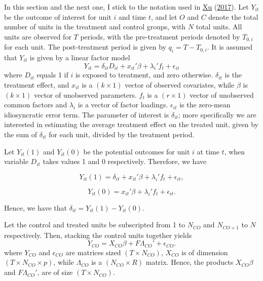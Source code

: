 \documentclass[12pt,nobind, a4paper]{reedthesis}
\begin{document}
 In this section and the next one, I stick to the notation used in \protect\hyperlink{ref-xu_generalized_2017}{Xu} (\protect\hyperlink{ref-xu_generalized_2017}{2017}). Let \(Y_{it}\) be the outcome of interest for unit \(i\) and time \(t\), and let \(O\) and \(C\) denote the total number of units in the treatment and control groups, with \(N\) total units. All units are observed for \(T\) periods, with the pre-treatment periods denoted by \(T_{0, i}\) for each unit. The post-treatment period is given by \(q_{i}=T-T_{0,i}\). It is assumed that \(Y_{it}\) is given by a linear factor model
 \begin{equation}
 Y_{it}=\delta_{it} D_{it}+ x_{it}'\beta+ \lambda_{i}'f_{t}+\epsilon_{it}
 \end{equation}
 where \(D_{it}\) equals 1 if \(i\) is exposed to treatment, and zero otherwise. \(\delta_{it}\) is the treatment effect, and \(x_{it}\) is a \((k \times 1)\) vector of observed covariates, while \(\beta\) is \((k \times 1)\) vector of unobserved parameters. \(f_{t}\) is a \((r \times 1)\) vector of unobserved common factors and \(\lambda_{i}\) is a vector of factor loadings. \(\epsilon_{it}\) is the zero-mean idiosyncratic error term. The parameter of interest is \(\delta_{it}\); more specifically we are interested in estimating the average treatment effect on the treated unit, given by the sum of \(\delta_{it}\) for each unit, divided by the treatment period.
 \linebreak

 Let \(Y_{it}(1)\) and \(Y_{it}(0)\) be the potential outcomes for unit \(i\) at time \(t\), when variable \(D_{it}\) takes values 1 and 0 respectively. Therefore, we have

 \[Y_{it}(1)=\delta_{it}+ x_{it}'\beta+ \lambda_{i}'f_{t}+\epsilon_{it},\]

 \[Y_{it}(0)=x_{it}'\beta + \lambda_{i}'f_{t}+\epsilon_{it}.\]

 Hence, we have that \(\delta_{it}= Y_{it}(1)-Y_{it}(0).\)

 Let the control and treated units be subscripted from 1 to \(N_{CO}\) and \(N_{CO+1}\) to \(N\) respectively. Then, stacking the control units together yields
 \begin{equation}
 Y_{CO}=X_{CO} \beta+ F \Lambda_{CO}'+\epsilon_{CO}.
 \end{equation}
 where \(Y_{CO}\) and \(\epsilon_{CO}\) are matrices sized \((T \times N_{CO})\), \(X_{CO}\) is of dimension \((T \times N_{CO} \times p)\), while \(\Lambda_{CO}\) is a \((N_{CO} \times R)\) matrix. Hence, the products \(X_{CO} \beta\) and \(F\Lambda_{CO}'\), are of size \((T \times N_{CO})\).
\end{document}
